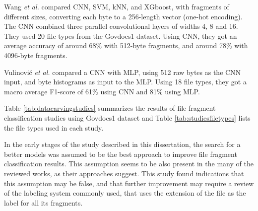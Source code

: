 Wang \textit{et al.} \cite{wang_file_2018}  
compared CNN, SVM, kNN, and XGboost, with fragments of different sizes, converting each byte to a 256-length vector (one-hot encoding). The CNN combined three parallel convolutional layers of widths 4, 8 and 16.
They used 20 file types from the Govdocs1 dataset.
Using CNN, they got an average accuracy of around 68\% with 512-byte fragments, and around 78\% with 4096-byte fragments.

Vulinović \textit{et al.} \cite{vulinovic_neural_2019}
compared a CNN with MLP, using 512 raw bytes as the CNN input, and byte histograms as input to the MLP.
Using 18 file types, they got a macro average F1-score of 61\% using CNN and 81\% using MLP.

Table \ref{tab:datacarvingstudies} summarizes 
the results of file fragment classification studies using Govdocs1 dataset and Table \ref{tab:studiesfiletypes}
lists the file types used in each study.






In the early stages of the study described in this dissertation, the search for a better models was assumed to be the best approach to improve file fragment classification results. This assumption seems to be also present in the many of the reviewed works, as their approaches suggest. This study found indications that this assumption may be false, and that further improvement may require a review of the labeling system commonly used, that uses the extension of the file as the label for all its fragments.
